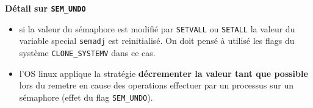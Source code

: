 \textbf{Détail sur \texttt{SEM\_UNDO}}

\begin{itemize}
\item
  si la valeur du sémaphore est modifié par \texttt{SETVALL} ou \texttt{SETALL} la
  valeur du variable special \texttt{semadj} est reinitialisé. On doit pensé à
  utilisé les flags du système \texttt{CLONE\_SYSTEMV} dans ce cas.\\

\item
  l'OS linux applique la stratégie \textbf{décrementer la valeur tant que possible} lors du
  remetre en cause des operations effectuer par un processus sur un sémaphore
  (effet du flag \texttt{SEM\_UNDO}).
\end{itemize}

